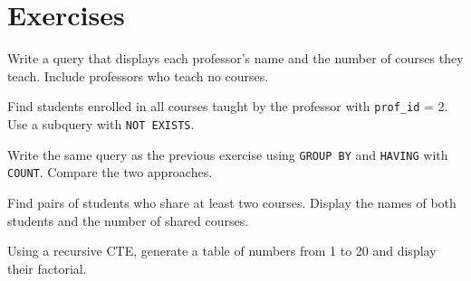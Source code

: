\section*{Exercises}

\begin{exercise}
Write a query that displays each professor's name and the number of courses
they teach. Include professors who teach no courses.
\end{exercise}

\begin{exercise}
Find students enrolled in all courses taught by the professor with
\texttt{prof\_id} = 2. Use a subquery with \texttt{NOT EXISTS}.
\end{exercise}

\begin{exercise}
Write the same query as the previous exercise using \texttt{GROUP BY} and
\texttt{HAVING} with \texttt{COUNT}. Compare the two approaches.
\end{exercise}

\begin{exercise}
Find pairs of students who share at least two courses. Display the names
of both students and the number of shared courses.
\end{exercise}

\begin{exercise}
Using a recursive CTE, generate a table of numbers from 1 to 20 and
display their factorial.
\end{exercise}

